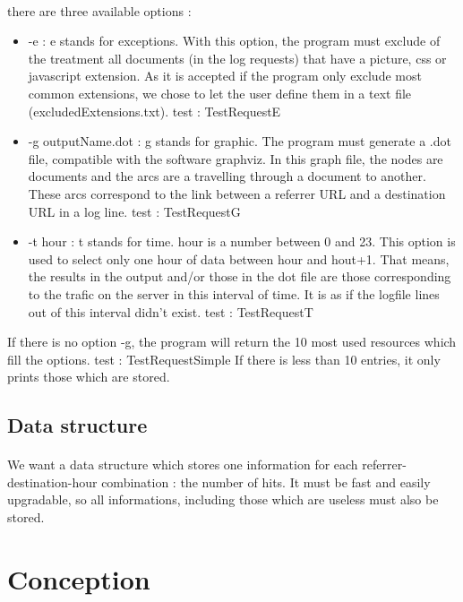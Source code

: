 \documentclass[a4paper, 12pts]{article}
\begin{document}
\paragraph{} 
 there are three available options :
 \begin{itemize}[label=$\square$]
 \item -e : e stands for exceptions. With this option, the program must exclude of the treatment all documents (in the log requests) that have a picture, css or javascript extension. As it is accepted if the program only exclude most common extensions, we chose to let the user define them in a text file (excludedExtensions.txt). test : TestRequestE
 \item -g outputName.dot : g stands for graphic. The program must generate a .dot file, compatible with the software graphviz. In this graph file, the nodes are documents and the arcs are a travelling through a document to another. These arcs correspond to the link between a referrer URL and a destination URL in a log line. test : TestRequestG
 \item -t hour : t stands for time. hour is a number between 0 and 23. This option is used to select only one hour of data between hour and hout+1. That means, the results in the output and/or those in the dot file are those corresponding to the trafic on the server in this interval of time. It is as if the logfile lines out of this interval didn't exist. test : TestRequestT
 \end{itemize}
 If there is no option -g, the program will return the 10 most used resources which fill the options. test : TestRequestSimple
 If there is less than 10 entries, it only prints those which are stored.

\subsection{Data structure}
\paragraph{}
 We want a data structure which stores one information for each referrer-destination-hour combination : the number of hits. It must be fast and easily upgradable, so all informations, including those which are useless must also be stored.
 
\newpage
 
\section{Conception}
\end{document}
